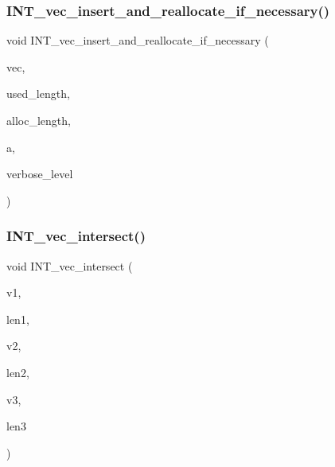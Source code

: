 \subsubsection{\texorpdfstring{I\+N\+T\+\_\+vec\+\_\+insert\+\_\+and\+\_\+reallocate\+\_\+if\+\_\+necessary()}{INT\_vec\_insert\_and\_reallocate\_if\_necessary()}}
{\footnotesize\ttfamily void I\+N\+T\+\_\+vec\+\_\+insert\+\_\+and\+\_\+reallocate\+\_\+if\+\_\+necessary (\begin{DoxyParamCaption}\item[{\mbox{\hyperlink{galois_8h_a09fddde158a3a20bd2dcadb609de11dc}{I\+NT}} $\ast$\&}]{vec,  }\item[{\mbox{\hyperlink{galois_8h_a09fddde158a3a20bd2dcadb609de11dc}{I\+NT}} \&}]{used\+\_\+length,  }\item[{\mbox{\hyperlink{galois_8h_a09fddde158a3a20bd2dcadb609de11dc}{I\+NT}} \&}]{alloc\+\_\+length,  }\item[{\mbox{\hyperlink{galois_8h_a09fddde158a3a20bd2dcadb609de11dc}{I\+NT}}}]{a,  }\item[{\mbox{\hyperlink{galois_8h_a09fddde158a3a20bd2dcadb609de11dc}{I\+NT}}}]{verbose\+\_\+level }\end{DoxyParamCaption})}

\mbox{\label{sorting_8_c_a19855973f5fb469b315f31e7e1402471}} 
\subsubsection{\texorpdfstring{I\+N\+T\+\_\+vec\+\_\+intersect()}{INT\_vec\_intersect()}}
{\footnotesize\ttfamily void I\+N\+T\+\_\+vec\+\_\+intersect (\begin{DoxyParamCaption}\item[{\mbox{\hyperlink{galois_8h_a09fddde158a3a20bd2dcadb609de11dc}{I\+NT}} $\ast$}]{v1,  }\item[{\mbox{\hyperlink{galois_8h_a09fddde158a3a20bd2dcadb609de11dc}{I\+NT}}}]{len1,  }\item[{\mbox{\hyperlink{galois_8h_a09fddde158a3a20bd2dcadb609de11dc}{I\+NT}} $\ast$}]{v2,  }\item[{\mbox{\hyperlink{galois_8h_a09fddde158a3a20bd2dcadb609de11dc}{I\+NT}}}]{len2,  }\item[{\mbox{\hyperlink{galois_8h_a09fddde158a3a20bd2dcadb609de11dc}{I\+NT}} $\ast$\&}]{v3,  }\item[{\mbox{\hyperlink{galois_8h_a09fddde158a3a20bd2dcadb609de11dc}{I\+NT}} \&}]{len3 }\end{DoxyParamCaption})}

